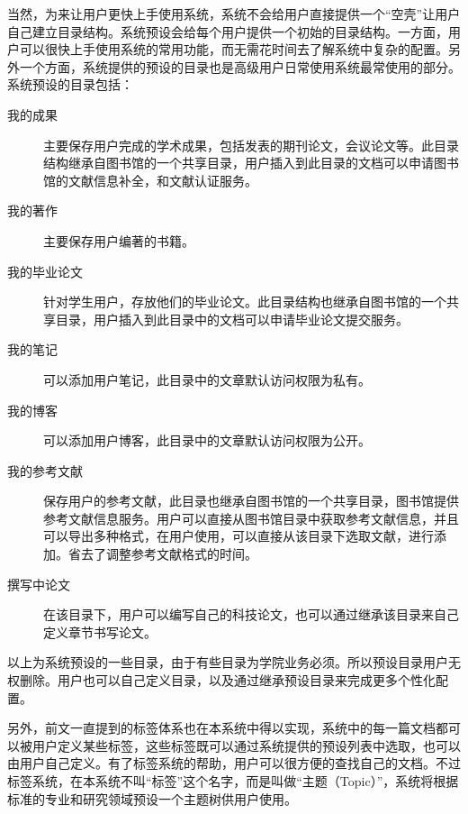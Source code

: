 当然，为来让用户更快上手使用系统，系统不会给用户直接提供一个“空壳”让用户自己建立目录结构。系统预设会给每个用户提供一个初始的目录结构。一方面，用户可以很快上手使用系统的常用功能，而无需花时间去了解系统中复杂的配置。另外一个方面，系统提供的预设的目录也是高级用户日常使用系统最常使用的部分。系统预设的目录包括：
\begin{description}
\item[我的成果] 主要保存用户完成的学术成果，包括发表的期刊论文，会议论文等。此目录结构继承自图书馆的一个共享目录，用户插入到此目录的文档可以申请图书馆的文献信息补全，和文献认证服务。
\item[我的著作] 主要保存用户编著的书籍。
\item[我的毕业论文] 针对学生用户，存放他们的毕业论文。此目录结构也继承自图书馆的一个共享目录，用户插入到此目录中的文档可以申请毕业论文提交服务。
\item[我的笔记] 可以添加用户笔记，此目录中的文章默认访问权限为私有。
\item[我的博客] 可以添加用户博客，此目录中的文章默认访问权限为公开。
\item[我的参考文献] 保存用户的参考文献，此目录也继承自图书馆的一个共享目录，图书馆提供参考文献信息服务。用户可以直接从图书馆目录中获取参考文献信息，并且可以导出多种格式，在用户使用，可以直接从该目录下选取文献，进行添加。省去了调整参考文献格式的时间。
\item[撰写中论文] 在该目录下，用户可以编写自己的科技论文，也可以通过继承该目录来自己定义章节书写论文。
\end{description}
以上为系统预设的一些目录，由于有些目录为学院业务必须。所以预设目录用户无权删除。用户也可以自己定义目录，以及通过继承预设目录来完成更多个性化配置。

另外，前文一直提到的标签体系也在本系统中得以实现，系统中的每一篇文档都可以被用户定义某些标签，这些标签既可以通过系统提供的预设列表中选取，也可以由用户自己定义。有了标签系统的帮助，用户可以很方便的查找自己的文档。不过标签系统，在本系统不叫“标签”这个名字，而是叫做“主题（Topic）”，系统将根据标准的专业和研究领域预设一个主题树供用户使用。